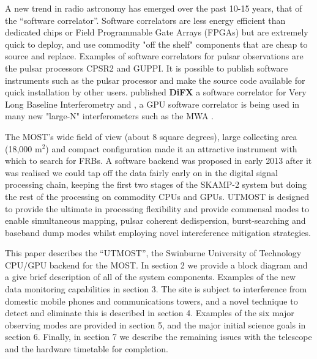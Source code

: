 A new trend in radio astronomy has emerged over the past 10-15 years, that of the ``software correlator''. Software correlators are less energy efficient than dedicated chips or Field Programmable Gate Arrays (FPGAs) but are extremely quick to deploy, and use commodity "off the shelf" components that are cheap to source and replace. Examples of software correlators for pulsar observations are the pulsar processors CPSR2 \citep{Bailes_2009} and GUPPI\citep{DuPlain_2008}. It is possible to publish software instruments such as the pulsar processor  \citep{van_Straten_2011} and make the source code available for quick installation by other users. \citep{Deller_2007} published {\bf DiFX} a software correlator for Very Long Baseline Interferometry and  \citep{Clark_2012}, a GPU software correlator is being used in many new "large-N" interferometers such as the MWA \citep{Tingay_2013}. 

The MOST's wide field of view (about 8 square degrees), large collecting area (18,000 m$^2$) and compact configuration made it an attractive instrument with which to search for FRBs. A software backend was proposed in early 2013 after it was realised we could tap off the data fairly early on in the digital signal processing chain, keeping the first two stages of the SKAMP-2 system but doing the rest of the processing on commodity CPUs and GPUs. UTMOST is designed to provide the ultimate in processing flexibility and provide commensal modes to enable simultaneous mapping, pulsar coherent dedispersion, burst-searching and baseband dump modes whilst employing novel intereference mitigation strategies.

This paper describes the ``UTMOST'', the Swinburne University of Technology CPU/GPU backend for the MOST. In section 2 we provide a block diagram and a give brief description of all of the system components. Examples of the new data monitoring capabilities in section 3. The site is subject to interference from domestic mobile phones and communications towers, and a novel technique to detect and eliminate this is described in section 4. Examples of the six major observing modes are provided in section 5, and the major initial science goals in section 6. Finally, in section 7 we describe the remaining issues with the telescope and the hardware timetable for completion.



